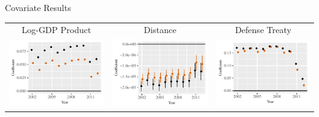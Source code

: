 \documentclass{beamer}
\begin{document}
\begin{frame}{Covariate Results}

\centering
\begin{tabular}{c@{\hskip -.4cm}c@{\hskip -.4cm}c}
\small{Log-GDP Product} & \small{Distance} & \small{Defense Treaty} \\
\includegraphics[height=.3\textheight, clip=true, trim=.5cm .5cm 0cm .1cm]{slides_figures/rl_plots/GDP_Dyad.pdf}    &
\includegraphics[height=.3\textheight, clip=true, trim=.5cm .5cm 0cm .1cm]{slides_figures/rl_plots/Distance.pdf}   &
\includegraphics[height=.3\textheight, clip=true, trim=.5cm .5cm 0cm .1cm]{slides_figures/rl_plots/Defense.pdf}\\



\end{tabular}
\end{frame}
\end{document}
